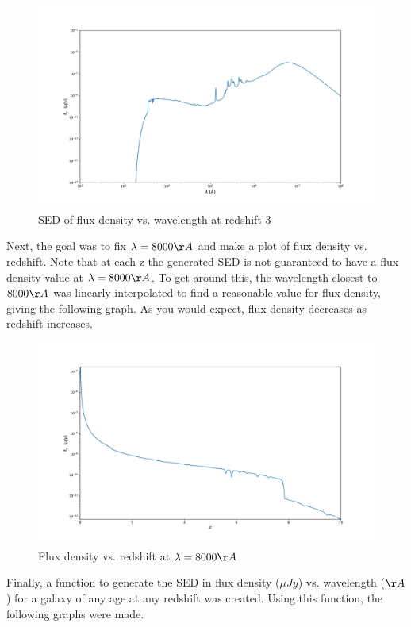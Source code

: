 \documentclass{article}
\begin{document}
\begin{figure}[H]
  \centering
\includegraphics[scale=0.3]{SED redshift 3}
\caption{SED of flux density vs. wavelength at redshift 3}
\end{figure}

Next, the goal was to fix $\lambda = 8000 \AA$ and make a plot of flux density vs. redshift. Note
that at each z the generated SED is not guaranteed to have a flux density value at $\lambda = 8000 \AA$. To
get around this, the wavelength closest to $8000 \AA$ was linearly interpolated to find a reasonable
value for flux density, giving the following graph. As you would expect, flux density decreases as redshift increases.

\begin{figure}[H]
  \centering
\includegraphics[scale=0.3]{flux density vs redshift}
\caption{Flux density vs. redshift at $\lambda = 8000 \AA$}
\end{figure}

Finally, a function to generate the
SED in flux density ($\mu Jy$) vs. wavelength ($\AA$) for a galaxy
of any age at any redshift was created. Using this function, the following graphs were made.
\end{document}
